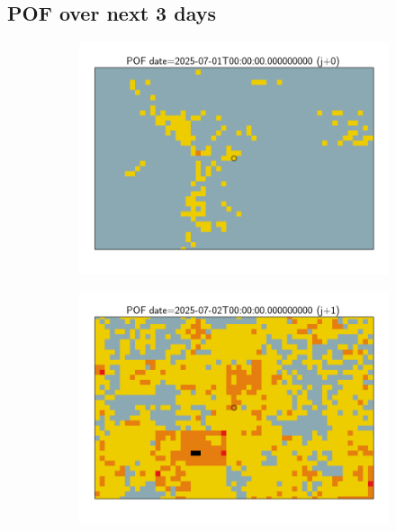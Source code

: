 \documentclass{article}
\begin{document}
\subsection*{POF over next 3 days}
\vspace{-1em}
\begin{figure}[H]
    \centering
    \begin{subfigure}[b]{0.31\textwidth}
        \centering
        \includegraphics[width=\linewidth]{pof_232_j0.png} %
    \end{subfigure}
    \begin{subfigure}[b]{0.31\textwidth}
        \centering
        \includegraphics[width=\linewidth]{pof_232_j1.png} %

\end{subfigure}
\end{figure}
\end{document}
